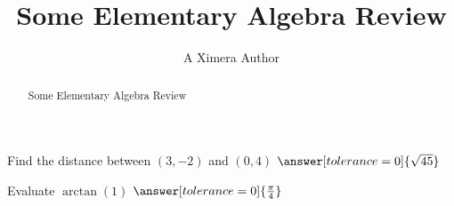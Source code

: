 \documentclass{ximera}
\title{Some Elementary Algebra Review}
\author{A Ximera Author}
\begin{document}
\begin{abstract}
Some Elementary Algebra Review
\end{abstract}

\maketitle

\begin{problem}
   Find the distance between $(3, -2)$ and $(0, 4)$ $\answer[tolerance=0]{\sqrt{45}}$
\end{problem}

\begin{problem}
   Evaluate $\arctan(1)$ $\answer[tolerance=0]{\frac{\pi}{4}}$
\end{problem}
\end{document}
